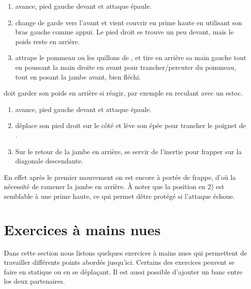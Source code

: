 \begin{technique}
\label{att:tech:changement-garde-2-temps-prime-haute}

\begin{enumerate}
	\item \D avance, pied gauche devant et \A attaque épaule.
	
	\item \D change de garde vers l'avant et vient couvrir en prime haute en utilisant son bras gauche comme appui.
	Le pied droit se trouve un peu devant, mais le poids reste en arrière.
	
	\item \D attrape le pommeau ou les quillons de \A, et tire en arrière sa main gauche tout en poussant la main droite en avant pour trancher/percuter du pommeau, tout en posant la jambe avant, bien fléchi.
\end{enumerate}

\D doit garder son poids en arrière si \A réagir, par exemple en reculant avec un estoc.

\end{technique}


\begin{technique}
\label{att:tech:changement-garde-2-temps-latéral-prime}

\begin{enumerate}
	\item \D avance, pied gauche devant et \A attaque épaule.
	
	\item \D déplace son pied droit sur le côté et lève son épée pour trancher le poignet de \A.
	
	\item Sur le retour de la jambe en arrière, se servir de l'inertie pour frapper sur la diagonale descendante.
\end{enumerate}

En effet après le premier mouvement on est encore à portée de frappe, d'où la nécessité de ramener la jambe en arrière.
À noter que la position en 2) est semblable à une prime haute, ce qui permet dêtre protégé si l'attaque échoue.
\end{technique}


\section{Exercices à mains nues}


Dans cette section nous listons quelques exercices à mains nues qui permettent de travailler différents points abordés jusqu'ici.
Certains des exercices peuvent se faire en statique ou en se déplaçant.
Il est aussi possible d'ajouter un banc entre les deux partenaires.


